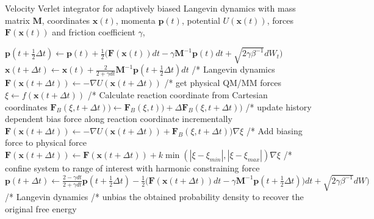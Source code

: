 \begin{algorithm}[H]
  \caption{Velocity Verlet integrator for adaptively biased Langevin dynamics with mass matrix $\textbf{M}$, coordinates $\textbf{x}(t)$, momenta $\textbf{p}(t)$, potential $U(\textbf{x}(t))$, forces $\textbf{F}(\textbf{x}(t))$ and friction coefficient $\gamma$,}
  \label{alg:ABM}
    \begin{algorithmic}
        \STATE
        \STATE $\textbf{p}(t+\frac{1}{2}\Delta t) \leftarrow \textbf{p}(t) + \frac{1}{2} \bigl(\textbf{F}(\textbf{x}(t))dt-\gamma \textbf{M}^{-1}\textbf{p}(t) dt + \sqrt{2\gamma\beta^{-1}}dW_t \bigr)$
        \STATE $\textbf{x}(t+\Delta t) \leftarrow \textbf{x}(t) + \frac{2}{2+\gamma dt}\textbf{M}^{-1} \textbf{p}(t+\frac{1}{2}\Delta t) dt$
        \STATE /* Langevin dynamics
        \STATE
        \STATE $\textbf{F}(\textbf{x}(t+\Delta t)) \leftarrow -\nabla U(\textbf{x}(t+\Delta t))$
        \STATE /* get physical QM/MM forces
        \STATE
        \STATE $\xi \leftarrow f(\textbf{x}(t+\Delta t))$
        \STATE /* Calculate reaction coordinate from Cartesian coordinates
        \STATE
          \STATE
          \STATE $\textbf{F}_{B}(\xi, t+\Delta t))\leftarrow \textbf{F}_{B}(\xi, t))+\Delta \textbf{F}_{B}(\xi,t+\Delta t))$
          \STATE /* update history dependent bias force along reaction coordinate incrementally
          \STATE
          \STATE $\textbf{F}(\textbf{x}(t+\Delta t)) \leftarrow -\nabla U(\textbf{x}(t+\Delta t)) + \textbf{F}_{B}(\xi, t+\Delta t))\nabla\xi$
          \STATE /* Add biasing force to physical force
          \STATE
        \ELSE
          \STATE
          \STATE $\textbf{F}(\textbf{x}(t+\Delta t)) \leftarrow \textbf{F}(\textbf{x}(t+\Delta t)) + k\min(|\xi-\xi_{min}|,|\xi-\xi_{max}|)\nabla\xi$
          \STATE /* confine system to range of interest with harmonic constraining force
          \STATE
        \ENDIF
        \STATE
        \STATE $\textbf{p}(t+\Delta t) \leftarrow \frac{2 - \gamma dt}{2+\gamma dt} \textbf{p}(t+\frac{1}{2}\Delta t) - \frac{1}{2} \bigl(\textbf{F}(\textbf{x}(t+\Delta t))dt-\gamma \textbf{M}^{-1}\textbf{p}(t+\frac{1}{2}\Delta t)) dt + \sqrt{2\gamma\beta^{-1}}dW\bigr)$
        \STATE /* Langevin dynamics
        \STATE
      \ENDWHILE
      \STATE /* unbias the obtained probability density to recover the original free energy
    \end{algorithmic}
\end{algorithm}

\newpage
